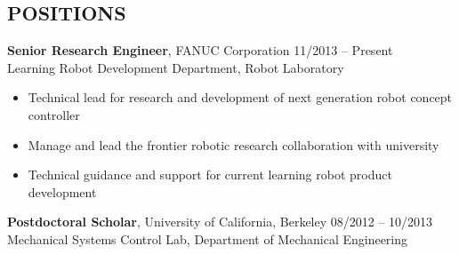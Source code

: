 \documentclass{res}
\begin{document}
\begin{resume}
\section{POSITIONS}
\vspace{0.1in}
\begin{list}{}{\setlength\leftmargin{0in}\setlength\topsep{0.15in}}
\item {\bf Senior Research Engineer}, FANUC Corporation \hfill 11/2013 -- Present\\
Learning Robot Development Department, Robot Laboratory
\begin{itemize}
	\item Technical lead for research and development of next generation robot concept controller
	\item Manage and lead the frontier robotic research collaboration with university
	\item Technical guidance and support for current learning robot product development
\end{itemize}

\item    {\bf Postdoctoral Scholar}, University of California, Berkeley    \hfill 08/2012 -- 10/2013\\
Mechanical Systems Control Lab, Department of Mechanical Engineering






\end{list}
\end{resume}
\end{document}
